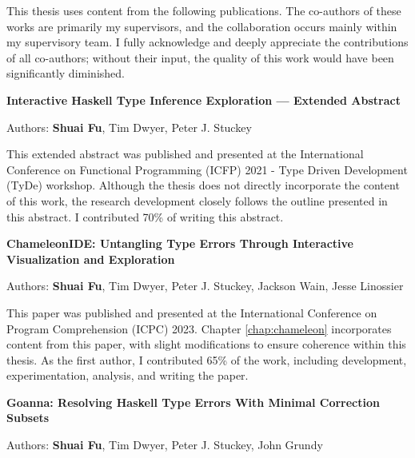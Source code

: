 \documentclass[
11pt, %
english, %
singlespacing, %
headsepline, %
]{MastersDoctoralThesis} %
\begin{document}
\begin{publications}

This thesis uses content from the following publications. The co-authors of these works are primarily my supervisors, and the collaboration occurs mainly within my supervisory team. I fully acknowledge and deeply appreciate the contributions of all co-authors; without their input, the quality of this work would have been significantly diminished.




\vspace{20px}

\noindent
\textbf{Interactive Haskell Type Inference Exploration --- Extended Abstract}

\noindent
Authors: \textbf{Shuai Fu}, Tim Dwyer, Peter J. Stuckey
\vspace{10px}

This extended abstract was published and presented at the International Conference on Functional Programming (ICFP) 2021 - Type Driven Development (TyDe) workshop.  Although the thesis does not directly incorporate the content of this work, the research development closely follows the outline presented in this abstract.  I contributed 70\% of writing this abstract.
 
\vspace{30px}

\noindent
\textbf{ChameleonIDE: Untangling Type Errors Through Interactive Visualization and Exploration}

\noindent
Authors: \textbf{Shuai Fu}, Tim Dwyer, Peter J. Stuckey, Jackson Wain, Jesse Linossier
\vspace{10px}

This paper was published and presented at the International Conference on Program Comprehension (ICPC) 2023. Chapter \ref{chap:chameleon} incorporates content from this paper, with slight modifications to ensure coherence within this thesis. As the first author, I contributed 65\% of the work, including development, experimentation, analysis, and writing the paper.
 

\vspace{30px}

\noindent
\textbf{Goanna: Resolving Haskell Type Errors With Minimal Correction Subsets}

\noindent
Authors: \textbf{Shuai Fu}, Tim Dwyer, Peter J. Stuckey, John Grundy
\vspace{10px}


\end{publications}
\end{document}
